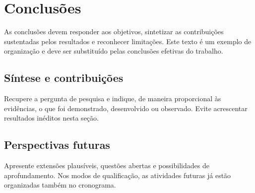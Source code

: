 \chapter{Conclusões}\label{chap:conclusoes}
As conclusões devem responder aos objetivos, sintetizar as contribuições sustentadas pelos resultados e reconhecer limitações. Este texto é um exemplo de organização e deve ser substituído pelas conclusões efetivas do trabalho.

\section{Síntese e contribuições}
Recupere a pergunta de pesquisa e indique, de maneira proporcional às evidências, o que foi demonstrado, desenvolvido ou observado. Evite acrescentar resultados inéditos nesta seção.

\section{Perspectivas futuras}
Apresente extensões plausíveis, questões abertas e possibilidades de aprofundamento. Nos modos de qualificação, as atividades futuras já estão organizadas também no cronograma.
